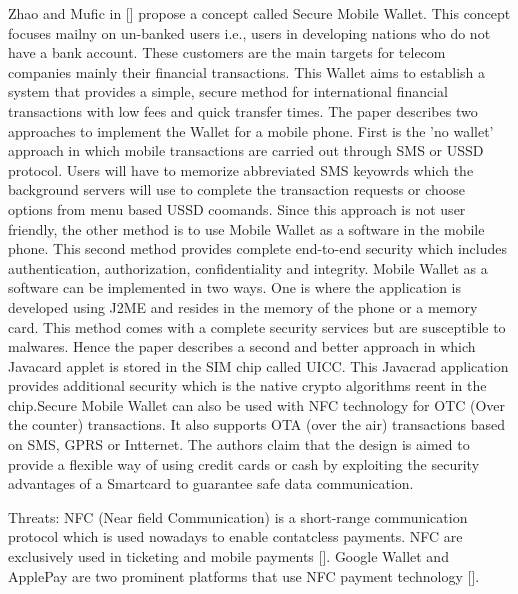 \documentclass{mproj}
\begin{document}
Zhao and Mufic in [] propose a concept called Secure Mobile Wallet. This concept focuses mailny on un-banked users i.e., users in developing nations who do not have a bank account. These customers are the main targets for telecom companies mainly their financial transactions. This Wallet aims to establish a system that provides a simple, secure method for international financial transactions with low fees and quick transfer times. The paper describes two approaches to implement the Wallet for a mobile phone. First is the 'no wallet' approach in which mobile transactions are carried out through SMS or USSD protocol. Users will have to memorize abbreviated SMS keyowrds which the background servers will use to complete the transaction requests or choose options from menu based USSD coomands. Since this approach is not user friendly, the other method is to use Mobile Wallet as a software in the mobile phone. This second method provides complete end-to-end security which includes authentication, authorization, confidentiality and integrity. Mobile Wallet as a software can be implemented in two ways. One is where the application is developed using J2ME and resides in the memory of the phone or a memory card. This method comes with a complete security services but are susceptible to malwares. Hence the paper describes a second and better approach in which Javacard applet is stored in the SIM chip called UICC. This Javacrad application provides additional security which is the native crypto algorithms reent in the chip.Secure Mobile Wallet can also be used with NFC technology for OTC (Over the counter) transactions. It also supports OTA (over the air) transactions based on SMS, GPRS or Intternet. The authors claim that the design is aimed to provide a flexible way of using credit cards or cash by exploiting the security advantages of a Smartcard to guarantee safe data communication.

Threats:
NFC (Near field Communication) is a short-range communication protocol which is used nowadays to enable contatcless payments. NFC are exclusively used in ticketing and mobile payments []. Google Wallet and ApplePay are two prominent platforms that use NFC payment technology [].
\end{document}
